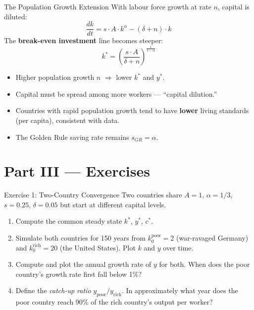 \documentclass[aspectratio=169, 10pt]{beamer}
\begin{document}
\begin{frame}{The Population Growth Extension}
With labour force growth at rate $n$, capital is diluted:
\[
  \frac{dk}{dt} = s \cdot A \cdot k^{\alpha} - (\delta + n) \cdot k
\]
The \textbf{break-even investment} line becomes steeper:
\[
  k^* = \left(\frac{s \cdot A}{\delta + n}\right)^{\!\frac{1}{1-\alpha}}
\]
\vspace{0.3em}
\begin{itemize}
  \item Higher population growth $n$ $\Rightarrow$ lower $k^*$ and $y^*$.
  \item Capital must be spread among more workers --- ``capital dilution.''
  \item Countries with rapid population growth tend to have
        \textbf{lower} living standards (per capita), consistent with data.
  \item The Golden Rule saving rate remains $s_{GR} = \alpha$.
\end{itemize}
\end{frame}

\section{Part III --- Exercises}

\begin{frame}{Exercise 1: Two-Country Convergence}
Two countries share $A = 1$, $\alpha = 1/3$, $s = 0.25$, $\delta = 0.05$
but start at different capital levels.
\vspace{0.5em}
\begin{enumerate}
  \item Compute the common steady state $k^*$, $y^*$, $c^*$.
  \item Simulate both countries for 150 years from
        $k_0^{\text{poor}} = 2$ (war-ravaged Germany) and
        $k_0^{\text{rich}} = 20$ (the United States).
        Plot $k$ and $y$ over time.
  \item Compute and plot the annual growth rate of $y$ for both.
        When does the poor country's growth rate first fall below 1\%?
  \item Define the \textit{catch-up ratio} $y_{\text{poor}}/y_{\text{rich}}$.
        In approximately what year does the poor country reach 90\%
        of the rich country's output per worker?
\end{enumerate}
\end{frame}
\end{document}
